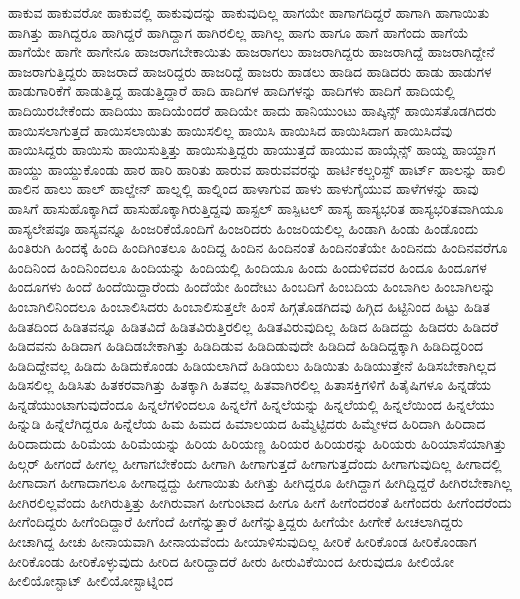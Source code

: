 {ಹಾಕುವ
ಹಾಕುವರೋ
ಹಾಕುವಲ್ಲಿ
ಹಾಕುವುದನ್ನು
ಹಾಕುವುದಿಲ್ಲ
ಹಾಗಯೇ
ಹಾಗಾಗದಿದ್ದರೆ
ಹಾಗಾಗಿ
ಹಾಗಾಯಿತು
ಹಾಗಿತ್ತು
ಹಾಗಿದ್ದರೂ
ಹಾಗಿದ್ದರೆ
ಹಾಗಿದ್ದಾಗ
ಹಾಗಿರಲಿಲ್ಲ
ಹಾಗಿಲ್ಲ
ಹಾಗು
ಹಾಗೂ
ಹಾಗೆ
ಹಾಗೆಂದು
ಹಾಗೆಯೆ
ಹಾಗೆಯೇ
ಹಾಗೇ
ಹಾಗೇನೂ
ಹಾಜರಾಗಬೇಕಾಯಿತು
ಹಾಜರಾಗಲು
ಹಾಜರಾಗಿದ್ದರು
ಹಾಜರಾಗಿದ್ದೆ
ಹಾಜರಾಗಿದ್ದೇನೆ
ಹಾಜರಾಗುತ್ತಿದ್ದರು
ಹಾಜರಾದೆ
ಹಾಜರಿದ್ದರು
ಹಾಜರಿದ್ದೆ
ಹಾಜರು
ಹಾಡಲು
ಹಾಡಿದ
ಹಾಡಿದರು
ಹಾಡು
ಹಾಡುಗಳ
ಹಾಡುಗಾರಿಕೆಗೆ
ಹಾಡುತ್ತಿದ್ದ
ಹಾಡುತ್ತಿದ್ದಾರೆ
ಹಾದಿ
ಹಾದಿಗಳ
ಹಾದಿಗಳನ್ನು
ಹಾದಿಗಳು
ಹಾದಿಗೆ
ಹಾದಿಯಲ್ಲಿ
ಹಾದಿಯಿರಬೇಕೆಂದು
ಹಾದಿಯು
ಹಾದಿಯೆಂದರೆ
ಹಾದಿಯೇ
ಹಾದು
ಹಾನಿಯುಂಟು
ಹಾಪ್ಕಿನ್ಸ್
ಹಾಯಿಸತೊಡಗಿದರು
ಹಾಯಿಸಲಾಗುತ್ತದೆ
ಹಾಯಿಸಲಾಯಿತು
ಹಾಯಿಸಲಿಲ್ಲ
ಹಾಯಿಸಿ
ಹಾಯಿಸಿದ
ಹಾಯಿಸಿದಾಗ
ಹಾಯಿಸಿದೆವು
ಹಾಯಿಸಿದ್ದರು
ಹಾಯಿಸು
ಹಾಯಿಸುತ್ತಿತ್ತು
ಹಾಯಿಸುತ್ತಿದ್ದರು
ಹಾಯುತ್ತದೆ
ಹಾಯುವ
ಹಾಯ್ಗೆನ್ಸ್
ಹಾಯ್ದ
ಹಾಯ್ದಾಗ
ಹಾಯ್ದು
ಹಾಯ್ದುಕೊಂಡು
ಹಾರ
ಹಾರಿ
ಹಾರಿತು
ಹಾರುವ
ಹಾರುವವರನ್ನು
ಹಾರ್ಟಿಕಲ್ಚರಿಸ್ಟ್
ಹಾರ್ಟ್
ಹಾಲನ್ನು
ಹಾಲಿ
ಹಾಲಿನ
ಹಾಲು
ಹಾಲ್
ಹಾಲ್ಡೇನ್
ಹಾಲ್ನಲ್ಲಿ
ಹಾಲ್ನಿಂದ
ಹಾಳಾಗುವ
ಹಾಳು
ಹಾಳುಗೈಯುವ
ಹಾಳೆಗಳನ್ನು
ಹಾವು
ಹಾಸಿಗೆ
ಹಾಸುಹೊಕ್ಕಾಗಿದೆ
ಹಾಸುಹೊಕ್ಕಾಗಿರುತ್ತಿದ್ದವು
ಹಾಸ್ಟಲ್
ಹಾಸ್ಪಿಟಲ್
ಹಾಸ್ಯ
ಹಾಸ್ಯಭರಿತ
ಹಾಸ್ಯಭರಿತವಾಗಿಯೂ
ಹಾಸ್ಯಲೇಪವೂ
ಹಾಸ್ಯವನ್ನೂ
ಹಿಂಜರಿಕೆಯೊಂದಿಗೆ
ಹಿಂಜರಿದರು
ಹಿಂಜರಿಯಲಿಲ್ಲ
ಹಿಂಡಾಗಿ
ಹಿಂಡು
ಹಿಂಡೊಂದು
ಹಿಂತಿರುಗಿ
ಹಿಂದಕ್ಕೆ
ಹಿಂದಿ
ಹಿಂದಿಗಿಂತಲೂ
ಹಿಂದಿದ್ದ
ಹಿಂದಿನ
ಹಿಂದಿನಂತೆ
ಹಿಂದಿನಂತೆಯೇ
ಹಿಂದಿನದು
ಹಿಂದಿನವರೆಗೂ
ಹಿಂದಿನಿಂದ
ಹಿಂದಿನಿಂದಲೂ
ಹಿಂದಿಯನ್ನು
ಹಿಂದಿಯಲ್ಲಿ
ಹಿಂದಿಯೂ
ಹಿಂದು
ಹಿಂದುಳಿದವರ
ಹಿಂದೂ
ಹಿಂದೂಗಳ
ಹಿಂದೂಗಳು
ಹಿಂದೆ
ಹಿಂದೆಯಿದ್ದಾರೆಂದು
ಹಿಂದೆಯೇ
ಹಿಂದೇಟು
ಹಿಂಬದಿಗೆ
ಹಿಂಬದಿಯ
ಹಿಂಬಾಗಿಲ
ಹಿಂಬಾಗಿಲನ್ನು
ಹಿಂಬಾಗಿಲಿನಿಂದಲೂ
ಹಿಂಬಾಲಿಸಿದರು
ಹಿಂಬಾಲಿಸುತ್ತಲೇ
ಹಿಂಸೆ
ಹಿಗ್ಗತೊಡಗಿದವು
ಹಿಗ್ಗಿದ
ಹಿಟ್ಟಿನಿಂದ
ಹಿಟ್ಟು
ಹಿಡಿತ
ಹಿಡಿತದಿಂದ
ಹಿಡಿತವನ್ನೂ
ಹಿಡಿತವಿದೆ
ಹಿಡಿತವಿರುತ್ತಿರಲಿಲ್ಲ
ಹಿಡಿತವಿರುವುದಿಲ್ಲ
ಹಿಡಿದ
ಹಿಡಿದದ್ದು
ಹಿಡಿದರು
ಹಿಡಿದರೆ
ಹಿಡಿದವನು
ಹಿಡಿದಾಗ
ಹಿಡಿದಿಡಬೇಕಾಗಿತ್ತು
ಹಿಡಿದಿಡುವ
ಹಿಡಿದಿಡುವುದೇ
ಹಿಡಿದಿದೆ
ಹಿಡಿದಿದ್ದಕ್ಕಾಗಿ
ಹಿಡಿದಿದ್ದರಿಂದ
ಹಿಡಿದಿದ್ದೇವಲ್ಲ
ಹಿಡಿದು
ಹಿಡಿದುಕೊಂಡು
ಹಿಡಿಯಲಾಗಿದೆ
ಹಿಡಿಯಲು
ಹಿಡಿಯಿತು
ಹಿಡಿಯುತ್ತೇನೆ
ಹಿಡಿಸಬೇಕಾಗಿಲ್ಲದ
ಹಿಡಿಸಲಿಲ್ಲ
ಹಿಡಿಸಿತು
ಹಿತಕರವಾಗಿತ್ತು
ಹಿತಕ್ಕಾಗಿ
ಹಿತವಲ್ಲ
ಹಿತವಾಗಿರಲಿಲ್ಲ
ಹಿತಾಸಕ್ತಿಗಳಿಗೆ
ಹಿತೈಷಿಗಳೂ
ಹಿನ್ನಡೆಯ
ಹಿನ್ನಡೆಯುಂಟಾಗುವುದೆಂದೂ
ಹಿನ್ನಲೆಗಳಿಂದಲೂ
ಹಿನ್ನಲೆಗೆ
ಹಿನ್ನಲೆಯನ್ನು
ಹಿನ್ನಲೆಯಲ್ಲಿ
ಹಿನ್ನಲೆಯಿಂದ
ಹಿನ್ನಲೆಯು
ಹಿನ್ನುಡಿ
ಹಿನ್ನೆಲೆಗಿದ್ದರೂ
ಹಿನ್ನೆಲೆಯ
ಹಿಮ
ಹಿಮದ
ಹಿಮಾಲಯದ
ಹಿಮ್ಮೆಟ್ಟಿದರು
ಹಿಮ್ಮೇಳದ
ಹಿರಿದಾಗಿ
ಹಿರಿದಾದ
ಹಿರಿದಾದುದು
ಹಿರಿಮೆಯ
ಹಿರಿಮೆಯನ್ನು
ಹಿರಿಯ
ಹಿರಿಯಣ್ಣ
ಹಿರಿಯರ
ಹಿರಿಯರನ್ನು
ಹಿರಿಯರು
ಹಿರಿಯಾಸೆಯಾಗಿತ್ತು
ಹಿಲ್ಗರ್
ಹೀಗಂದೆ
ಹೀಗಲ್ಲ
ಹೀಗಾಗಬೇಕೆಂದು
ಹೀಗಾಗಿ
ಹೀಗಾಗುತ್ತದೆ
ಹೀಗಾಗುತ್ತದೆಂದು
ಹೀಗಾಗುವುದಿಲ್ಲ
ಹೀಗಾದಲ್ಲಿ
ಹೀಗಾದಾಗ
ಹೀಗಾದಾಗಲೂ
ಹೀಗಾದ್ದದ್ದು
ಹೀಗಾಯಿತು
ಹೀಗಿತ್ತು
ಹೀಗಿದ್ದರೂ
ಹೀಗಿದ್ದಾಗ
ಹೀಗಿದ್ದಿದ್ದರೆ
ಹೀಗಿರಬೇಕಾಗಿಲ್ಲ
ಹೀಗಿರಲಿಲ್ಲವೆಂದು
ಹೀಗಿರುತ್ತಿತ್ತು
ಹೀಗಿರುವಾಗ
ಹೀಗುಂಟಾದ
ಹೀಗೂ
ಹೀಗೆ
ಹೀಗೆಂದರಂತೆ
ಹೀಗೆಂದರು
ಹೀಗೆಂದರೆಂದು
ಹೀಗೆಂದಿದ್ದರು
ಹೀಗೆಂದಿದ್ದಾರೆ
ಹೀಗೆಂದೆ
ಹೀಗೆನ್ನುತ್ತಾರೆ
ಹೀಗೆನ್ನುತ್ತಿದ್ದರು
ಹೀಗೆಯೇ
ಹೀಗೇಕೆ
ಹೀಚಲಾಗಿದ್ದರು
ಹೀಚಾಗಿದ್ದ
ಹೀಚು
ಹೀನಾಯವಾಗಿ
ಹೀನಾಯವೆಂದು
ಹೀಯಾಳಿಸುವುದಿಲ್ಲ
ಹೀರಿಕೆ
ಹೀರಿಕೊಂಡ
ಹೀರಿಕೊಂಡಾಗ
ಹೀರಿಕೊಂಡು
ಹೀರಿಕೊಳ್ಳುವುದು
ಹೀರಿದ
ಹೀರಿದ್ದಾದರೆ
ಹೀರು
ಹೀರುವಿಕೆಯಿಂದ
ಹೀರುವುದೂ
ಹೀಲಿಯೋ
ಹೀಲಿಯೋಸ್ಟಾಟ್
ಹೀಲಿಯೋಸ್ಟಾಟ್ನಿಂದ
}
